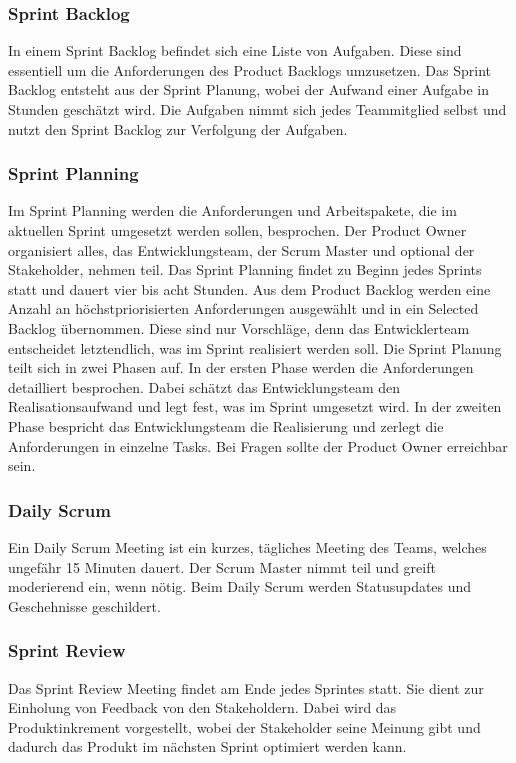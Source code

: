 \subsubsection{Sprint Backlog} 
In einem Sprint Backlog befindet sich eine Liste von Aufgaben. Diese sind essentiell um die Anforderungen des Product Backlogs umzusetzen. Das Sprint Backlog entsteht aus der Sprint Planung, wobei der Aufwand einer Aufgabe in Stunden geschätzt wird. Die Aufgaben nimmt sich jedes Teammitglied selbst und nutzt den Sprint Backlog zur Verfolgung der Aufgaben. \cite{backlog}

\subsubsection{Sprint Planning} 
Im Sprint Planning werden die Anforderungen und Arbeitspakete, die im aktuellen Sprint umgesetzt werden sollen, besprochen. Der Product Owner organisiert alles, das Entwicklungsteam, der Scrum Master und optional der Stakeholder, nehmen teil.  Das Sprint Planning findet zu Beginn jedes Sprints statt und dauert vier bis acht Stunden. Aus dem Product Backlog werden eine Anzahl an höchstpriorisierten Anforderungen ausgewählt und in ein Selected Backlog übernommen. Diese sind nur Vorschläge, denn das Entwicklerteam entscheidet letztendlich, was im Sprint realisiert werden soll. Die Sprint Planung teilt sich in zwei Phasen auf. In der ersten Phase werden die Anforderungen detailliert besprochen. Dabei schätzt das Entwicklungsteam den Realisationsaufwand und legt fest, was im Sprint umgesetzt wird. In der zweiten Phase bespricht das Entwicklungsteam die Realisierung und zerlegt die Anforderungen in einzelne Tasks. Bei Fragen sollte der Product Owner erreichbar sein. \cite{sprintplanning}

\subsubsection{Daily Scrum} 
Ein Daily Scrum Meeting ist ein kurzes, tägliches Meeting des Teams, welches ungefähr 15 Minuten dauert. Der Scrum Master nimmt teil und greift moderierend ein, wenn nötig. Beim Daily Scrum werden Statusupdates und Geschehnisse geschildert. \cite{dailyscrum}

\subsubsection{Sprint Review} 
Das Sprint Review Meeting findet am Ende jedes Sprintes statt. Sie dient zur Einholung von Feedback von den Stakeholdern. Dabei wird das Produktinkrement vorgestellt, wobei der Stakeholder seine Meinung gibt und dadurch das Produkt im nächsten Sprint optimiert werden kann. \cite{sprintreview}

